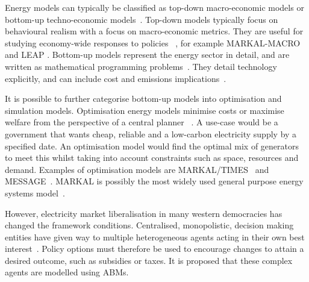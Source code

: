 
Energy models can typically be classified as top-down macro-economic models or bottom-up techno-economic models~\cite{Bohringer1998}. Top-down models typically focus on behavioural realism with a focus on macro-economic metrics. They are useful for studying economy-wide responses to policies ~\cite{Hall2016}, for example MARKAL-MACRO \cite{Fishbone1981} and LEAP \cite{Heaps2016}. Bottom-up models represent the energy sector in detail, and are written as mathematical programming problems~\cite{Gargiulo2013}. They detail technology explicitly, and can include cost and emissions implications~\cite{Hall2016}.

It is possible to further categorise bottom-up models into optimisation and simulation models. Optimisation energy models minimise costs or maximise welfare from the perspective of a central planner ~\cite{Keles2017}. A use-case would be a government that wants cheap, reliable and a low-carbon electricity supply by a specified date. An optimisation model would find the optimal mix of generators to meet this whilst taking into account constraints such as space, resources and demand. Examples of optimisation models are MARKAL/TIMES~\cite{Fishbone1981} and MESSAGE~\cite{Schrattenholzer1981}. MARKAL is possibly the most widely used general purpose energy systems model~\cite{Pfenninger2014}.

However, electricity market liberalisation in many western democracies has changed the framework conditions. Centralised, monopolistic, decision making entities have given way to multiple heterogeneous agents acting in their own best interest~\cite{Most2010}. Policy options must therefore be used to encourage changes to attain a desired outcome, such as subsidies or taxes. It is proposed that these complex agents are modelled using ABMs.

